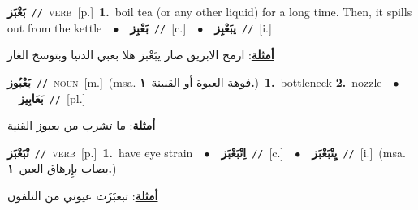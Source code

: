\documentclass[10pt,a4paper,twoside]{article} %
\begin{document}
\begin{multicols}{2}
{\setlength\topsep{0pt}\textbf{\foreignlanguage{arabic}{بَعْبَز}}\ {\color{gray}\texttt{//}\color{black}}\ \textsc{verb}\ [p.]\ \textbf{1.}~boil tea (or any other liquid) for a long time. Then, it spills out from the kettle\ \ $\bullet$\ \ \setlength\topsep{0pt}\textbf{\foreignlanguage{arabic}{بَعْبِز}}\ {\color{gray}\texttt{//}\color{black}}\ [c.]\ \ $\bullet$\ \ \setlength\topsep{0pt}\textbf{\foreignlanguage{arabic}{يبَعْبِز}}\ {\color{gray}\texttt{//}\color{black}}\ [i.]\  \begin{flushright}\color{gray}\foreignlanguage{arabic}{\textbf{\underline{\foreignlanguage{arabic}{أمثلة}}}: ارمح الابريق صار يبَعْبز هلا بعبي الدنيا وبتوسخ الغاز}\end{flushright}\color{black}} \vspace{2mm}

{\setlength\topsep{0pt}\textbf{\foreignlanguage{arabic}{بَعْبُوز}}\ {\color{gray}\texttt{//}\color{black}}\ \textsc{noun}\ [m.]\ \color{gray}(msa. \foreignlanguage{arabic}{فوهة العبوة أو القنينة}~\foreignlanguage{arabic}{\textbf{١.}})\color{black}\ \textbf{1.}~bottleneck  \textbf{2.}~nozzle\ \ $\bullet$\ \ \setlength\topsep{0pt}\textbf{\foreignlanguage{arabic}{بَعَابِيز}}\ {\color{gray}\texttt{//}\color{black}}\ [pl.]\  \begin{flushright}\color{gray}\foreignlanguage{arabic}{\textbf{\underline{\foreignlanguage{arabic}{أمثلة}}}: ما تشرب من بعبوز القنية}\end{flushright}\color{black}} \vspace{2mm}

{\setlength\topsep{0pt}\textbf{\foreignlanguage{arabic}{تْبَعْبَز}}\ {\color{gray}\texttt{//}\color{black}}\ \textsc{verb}\ [p.]\ \textbf{1.}~have eye strain\ \ $\bullet$\ \ \setlength\topsep{0pt}\textbf{\foreignlanguage{arabic}{اِتْبَعْبَز}}\ {\color{gray}\texttt{//}\color{black}}\ [c.]\ \ $\bullet$\ \ \setlength\topsep{0pt}\textbf{\foreignlanguage{arabic}{يِتْبَعْبَز}}\ {\color{gray}\texttt{//}\color{black}}\ [i.]\ \color{gray}(msa. \foreignlanguage{arabic}{يصاب بإِرهاق العين}~\foreignlanguage{arabic}{\textbf{١.}})\color{black}\  \begin{flushright}\color{gray}\foreignlanguage{arabic}{\textbf{\underline{\foreignlanguage{arabic}{أمثلة}}}: تبعبَزَت عيوني من التلفون}\end{flushright}\color{black}} \vspace{2mm}


\end{multicols}
\end{document}
